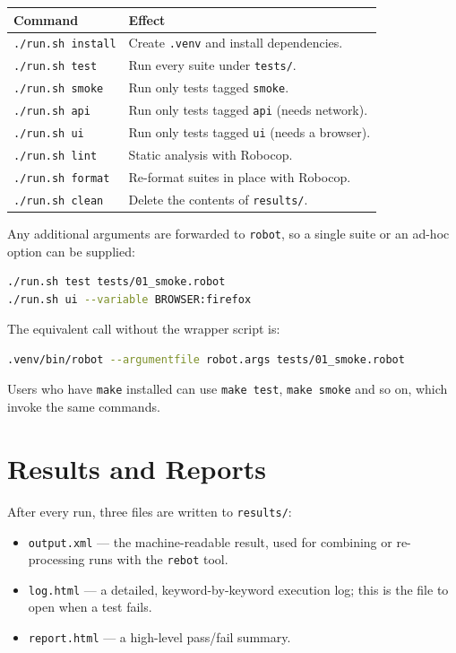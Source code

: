 \documentclass[a4paper,12pt]{article}
\newcommand{\code}[1]{\texttt{#1}}
\begin{document}
\begin{longtable}{p{} p{}}
\hline
\textbf{Command} & \textbf{Effect} \\
\hline
\endhead
\code{./run.sh install} & Create \code{.venv} and install dependencies. \\
\code{./run.sh test} & Run every suite under \code{tests/}. \\
\code{./run.sh smoke} & Run only tests tagged \code{smoke}. \\
\code{./run.sh api} & Run only tests tagged \code{api} (needs network). \\
\code{./run.sh ui} & Run only tests tagged \code{ui} (needs a browser). \\
\code{./run.sh lint} & Static analysis with Robocop. \\
\code{./run.sh format} & Re-format suites in place with Robocop. \\
\code{./run.sh clean} & Delete the contents of \code{results/}. \\
\hline
\end{longtable}

\noindent Any additional arguments are forwarded to \code{robot}, so a single
suite or an ad-hoc option can be supplied:

\begin{lstlisting}[language=bash]
./run.sh test tests/01_smoke.robot
./run.sh ui --variable BROWSER:firefox
\end{lstlisting}

\noindent The equivalent call without the wrapper script is:

\begin{lstlisting}[language=bash]
.venv/bin/robot --argumentfile robot.args tests/01_smoke.robot
\end{lstlisting}

\noindent Users who have \code{make} installed can use \code{make test},
\code{make smoke} and so on, which invoke the same commands.

\section{Results and Reports}

After every run, three files are written to \code{results/}:

\begin{itemize}
  \item \code{output.xml} --- the machine-readable result, used for combining or
        re-processing runs with the \code{rebot} tool.
  \item \code{log.html} --- a detailed, keyword-by-keyword execution log; this is
        the file to open when a test fails.
  \item \code{report.html} --- a high-level pass/fail summary.
\end{itemize}
\end{document}
